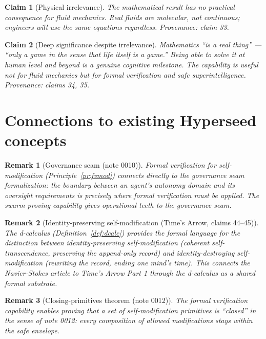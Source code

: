 \documentclass[11pt]{article}
\newtheorem{claim}{Claim}
\newtheorem{remark}{Remark}
\begin{document}
\begin{claim}[Physical irrelevance]\label{cl:irrelevant}
The mathematical result has no practical consequence for fluid mechanics.
Real fluids are molecular, not continuous; engineers will use the same
equations regardless.
\emph{Provenance: claim 33.}
\end{claim}

\begin{claim}[Deep significance despite irrelevance]\label{cl:significant}
Mathematics ``is a real thing'' --- ``only a game in the sense that life
itself is a game.''  Being able to solve it at human level and beyond is a
genuine cognitive milestone.  The capability is useful not for fluid
mechanics but for formal verification and safe superintelligence.
\emph{Provenance: claims 34, 35.}
\end{claim}


\section{Connections to existing Hyperseed concepts}

\begin{remark}[Governance seam (note 0010)]
Formal verification for self-modification (Principle~\ref{pr:fvmod})
connects directly to the governance seam formalization: the boundary
between an agent's autonomy domain and its oversight requirements is
precisely where formal verification must be applied.  The swarm proving
capability gives operational teeth to the governance seam.
\end{remark}

\begin{remark}[Identity-preserving self-modification (Time's Arrow, claims 44--45)]
The d-calculus (Definition~\ref{def:dcalc}) provides the formal language for
the distinction between identity-preserving self-modification (coherent
self-transcendence, preserving the append-only record) and
identity-destroying self-modification (rewriting the record, ending one
mind's time).  This connects the Navier-Stokes article to Time's Arrow
Part 1 through the d-calculus as a shared formal substrate.
\end{remark}

\begin{remark}[Closing-primitives theorem (note 0012)]
The formal verification capability enables proving that a set of
self-modification primitives is ``closed'' in the sense of note 0012:
every composition of allowed modifications stays within the safe envelope.
\end{remark}
\end{document}
